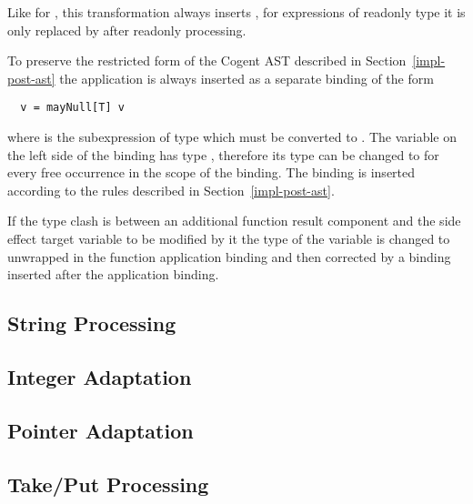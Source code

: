 Like for , this transformation always inserts , for expressions of readonly type it is only replaced by
 after readonly processing.

To preserve the restricted form of the Cogent AST described in Section~\ref{impl-post-ast} the  application is always
inserted as a separate binding of the form
\begin{verbatim}
  v = mayNull[T] v
\end{verbatim}
where  is the subexpression of type  which must be converted to . The variable  on the left side
of the binding has type , therefore its type can be changed to  for every free occurrence in the scope
of the binding. The binding is inserted according to the rules described in Section~\ref{impl-post-ast}.

If the type clash is between an additional function result component and the side effect target variable to be modified by it the
type of the variable is changed to unwrapped in the function application binding and then corrected by a  binding inserted
after the application binding.

\subsection{String Processing}
\label{impl-post-string}

\subsection{Integer Adaptation}
\label{impl-post-int}

\subsection{Pointer Adaptation}
\label{impl-post-pointer}

\subsection{Take/Put Processing}
\label{impl-post-takeput}

